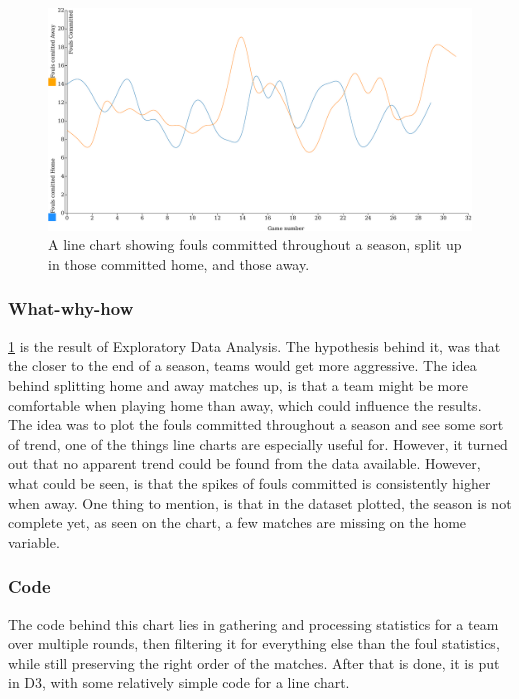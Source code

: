 \documentclass[Report.tex]{subfiles}
\begin{document}
\begin{figure}
\center
\includegraphics[width=\textwidth]{Figures/fouls.pdf}
\caption{A line chart showing fouls committed throughout a season, split up in those committed home, and those away.}
\label{Fig:FOULS}
\end{figure}


\subsubsection{What-why-how}
\ref{Fig:FOULS} is the result of Exploratory Data Analysis. The hypothesis behind it, was that the closer to the end of a season, teams would get more aggressive. The idea behind splitting home and away matches up, is that a team might be more comfortable when playing home than away, which could influence the results.\\
The idea was to plot the fouls committed throughout a season and see some sort of trend, one of the things line charts are especially useful for. However, it turned out that no apparent trend could be found from the data available. However, what could be seen, is that the spikes of fouls committed is consistently higher when away. One thing to mention, is that in the dataset plotted, the season is not complete yet, as seen on the chart, a few matches are missing on the home variable.

\subsubsection{Code}
The code behind this chart lies in gathering and processing statistics for a team over multiple rounds, then filtering it for everything else than the foul statistics, while still preserving the right order of the matches. After that is done, it is put in D3, with some relatively simple code for a line chart.
\end{document}
